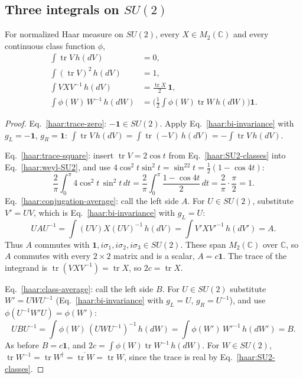 \subsection{Three integrals on \texorpdfstring{$SU(2)$}{SU(2)}}
\begin{proposition}\label{haar:prop:SU2-integrals}
For normalized Haar measure on $SU(2)$, every $X\in M_2(\mathbb C)$ and
every continuous class function $\phi$,
\begin{align}
 \int\operatorname{tr}V\,h(dV)&=0,\label{haar:trace-zero}\\
 \int(\operatorname{tr}V)^2\,h(dV)&=1,\label{haar:trace-square}\\
 \int VXV^{-1}\,h(dV)&=\frac{\operatorname{tr}X}{2}\,\mathbf 1,
 \label{haar:conjugation-average}\\
 \int\phi(W)\,W^{-1}\,h(dW)&=\Big(\frac12\int\phi(W)\operatorname{tr}W\,h(dW)\Big)\mathbf 1 .
 \label{haar:class-average}
\end{align}
\end{proposition}
\begin{proof}
Eq.~\eqref{haar:trace-zero}: $-\mathbf 1\in SU(2)$. Apply
Eq.~\eqref{haar:bi-invariance} with $g_L=-\mathbf 1$, $g_R=\mathbf 1$:
$\int\operatorname{tr}V\,h(dV)=\int\operatorname{tr}(-V)\,h(dV)
=-\int\operatorname{tr}V\,h(dV)$.

Eq.~\eqref{haar:trace-square}: insert $\operatorname{tr}V=2\cos t$ from
Eq.~\eqref{haar:SU2-classes} into Eq.~\eqref{haar:weyl-SU2}, and use
$4\cos^2t\sin^2t=\sin^22t=\frac12(1-\cos4t)$:
\begin{equation}
 \frac2\pi\int_0^\pi4\cos^2t\,\sin^2t\,dt
 =\frac2\pi\int_0^\pi\frac{1-\cos4t}{2}\,dt=\frac2\pi\cdot\frac\pi2=1 .
\end{equation}
Eq.~\eqref{haar:conjugation-average}: call the left side $A$. For
$U\in SU(2)$, substitute $V'=UV$, which is Eq.~\eqref{haar:bi-invariance}
with $g_L=U$:
\begin{equation}
 UAU^{-1}=\int(UV)X(UV)^{-1}\,h(dV)=\int V'X{V'}^{-1}\,h(dV')=A .
\end{equation}
Thus $A$ commutes with $\mathbf 1,i\sigma_1,i\sigma_2,i\sigma_3\in SU(2)$.
These span $M_2(\mathbb C)$ over $\mathbb C$, so $A$ commutes with every
$2\times2$ matrix and is a scalar, $A=c\mathbf 1$. The trace of the integrand
is $\operatorname{tr}(VXV^{-1})=\operatorname{tr}X$, so $2c=\operatorname{tr}X$.

Eq.~\eqref{haar:class-average}: call the left side $B$. For $U\in SU(2)$
substitute $W'=UWU^{-1}$ (Eq.~\eqref{haar:bi-invariance} with $g_L=U$,
$g_R=U^{-1}$), and use $\phi(U^{-1}W'U)=\phi(W')$:
\begin{equation}
 UBU^{-1}=\int\phi(W)\,(UWU^{-1})^{-1}\,h(dW)=\int\phi(W')\,{W'}^{-1}\,h(dW')=B .
\end{equation}
As before $B=c\mathbf 1$, and $2c=\int\phi(W)\operatorname{tr}W^{-1}\,h(dW)$.
For $W\in SU(2)$, $\operatorname{tr}W^{-1}=\operatorname{tr}W^\dagger
=\overline{\operatorname{tr}W}=\operatorname{tr}W$, since the trace is real by
Eq.~\eqref{haar:SU2-classes}.
\end{proof}
